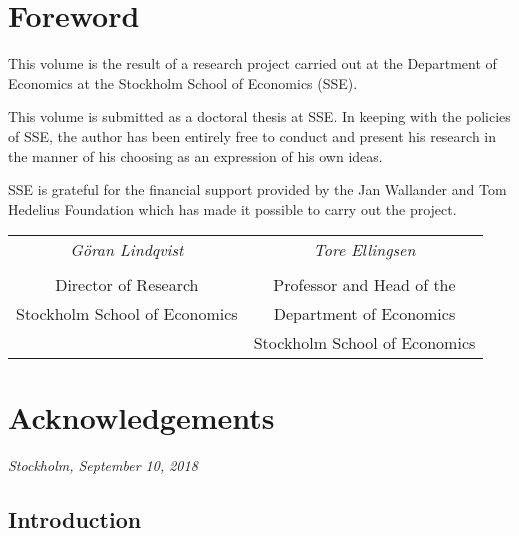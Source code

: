 \documentclass[twoside,11pt,american,openright,final]{memoir}
\begin{document}
\cleardoublepage
\chapter*{Foreword}\thispagestyle{empty}
This volume is the result of a research project carried out at the Department of Economics at the Stockholm School of Economics (SSE).

This volume is submitted as a doctoral thesis at SSE. In keeping with the policies of SSE, the author has been entirely free to conduct and present his research in the manner of his choosing as an expression of his own ideas.

SSE is grateful for the financial support provided by the Jan Wallander and Tom Hedelius Foundation which has made it possible to carry out the project.

\vspace{2\onelineskip}

\begin{tabular}{cc}
\emph{Göran Lindqvist} & \emph{Tore Ellingsen}\\
& \\
Director of Research & Professor and Head of the\\
Stockholm School of Economics & Department of Economics\\
& Stockholm School of Economics
\end{tabular}
\cleardoublepage

\chapter*{Acknowledgements}\thispagestyle{empty}
\par\bigskip
\begin{center}
\emph{Stockholm, September 10, 2018}\par\smallskip
\emph{\theauthor}
\end{center}
\cleardoublepage

\tableofcontents*%
\cleardoublepage%
\mainmatter%

\begin{refsection}
\chapter*{Introduction}

\clearpage
\nobibintoc{}\bibintoc
\end{refsection}
\end{document}

